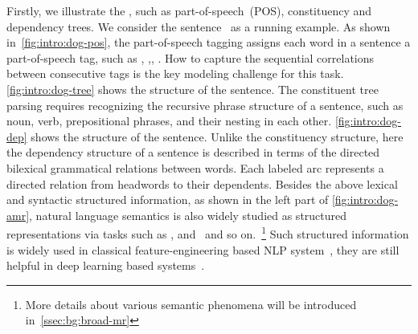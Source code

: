 Firstly, we illustrate the , such as
part-of-speech~(POS), constituency and dependency trees. We consider
the sentence ~as a running example. As shown
in~\autoref{fig:intro:dog-pos}, the part-of-speech tagging assigns
each word in a sentence a part-of-speech tag, such as ,
,, . How to capture the
sequential correlations between consecutive tags is the key modeling
challenge for this task.  \autoref{fig:intro:dog-tree} shows the
 structure of the sentence. The constituent tree
parsing requires recognizing the recursive phrase structure of a
sentence, such as noun, verb, prepositional phrases, and their nesting
in each other. \autoref{fig:intro:dog-dep} shows the  structure of the sentence. Unlike the constituency structure,
here the dependency structure of a sentence is described in terms of
the directed bilexical grammatical relations between words. Each
labeled arc represents a directed relation from headwords to their
dependents. Besides the above lexical and syntactic structured
information, as shown in the left part of \autoref{fig:intro:dog-amr},
natural language semantics is also widely studied as structured
representations via tasks such as ,
 and~ and so
on.~\footnote{More details about various semantic phenomena will be
  introduced in~\autoref{ssec:bg:broad-mr}} Such structured
information is widely used in classical feature-engineering based NLP
system~\citep[\eg,][]{Joh:Nug:08,hovy2010s,punyakanok2008importance},
they are still helpful in deep learning based
systems~\citep{moosavi-strube-2018-using,strubell-etal-2018-linguistically,bowman-etal-2016-fast}.

